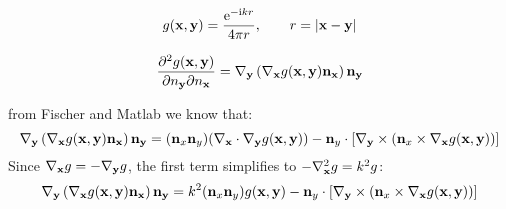 \documentclass{article}
\newcommand{\te}{\mathrm{e}}
\newcommand{\ti}{\mathrm{i}}
\begin{document}
\begin{equation}
g({\bf x},{\bf y}) = \frac{\te^{-\ti k r}}{4\pi r}, \qquad
r = |{\bf x} - {\bf y}|
\end{equation}

\begin{equation}
\frac{\partial^2 g({\bf x},{\bf y})}{\partial n_{\bf y}\partial n_{\bf x}} =
\nabla_{\bf y} \left( \nabla_{\bf x} g({\bf x},{\bf y}) {\bf n}_{\bf x} \right) {\bf n}_{\bf y}
\end{equation}

from Fischer and Matlab we know that:
%
\begin{equation}
\nabla_{\bf y} \left( \nabla_{\bf x} g({\bf x},{\bf y}) {\bf n}_{\bf x} \right) {\bf n}_{\bf y}
=
({\bf n}_x {\bf n}_y) (\nabla_{\bf x}\cdot \nabla_{\bf y} g({\bf x},{\bf y}))
-
{\bf n}_y \cdot \left[\nabla_{\bf y} \times \left({\bf n}_x\times \nabla_{\bf x}g({\bf x}, {\bf y})\right)\right]
\end{equation}
%
Since $\nabla_{\bf x} g = -\nabla_{\bf y} g$, the first term simplifies to $-\nabla_{\bf x}^2 g = k^2 g$:
%
\begin{equation}
\nabla_{\bf y} \left( \nabla_{\bf x} g({\bf x},{\bf y}) {\bf n}_{\bf x} \right) {\bf n}_{\bf y}
=
k^2 ({\bf n}_x {\bf n}_y) g({\bf x},{\bf y})
-
{\bf n}_y \cdot \left[\nabla_{\bf y} \times \left({\bf n}_x\times \nabla_{\bf x}g({\bf x}, {\bf y})\right)\right]
\end{equation}
\end{document}
